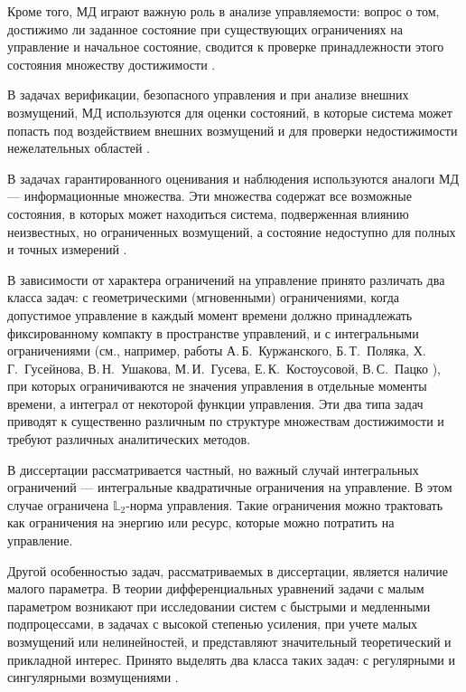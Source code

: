 \documentclass[../main.tex]{subfiles}
\begin{document}
Кроме того, МД играют важную роль в анализе управляемости: вопрос о том, достижимо ли заданное состояние при существующих ограничениях на управление и начальное состояние, сводится к проверке принадлежности этого состояния множеству достижимости \cite{Kur1, Kurzhanski1977}.

В задачах верификации, безопасного управления и при анализе внешних возмущений, МД используются для оценки состояний, в которые система может попасть под воздействием внешних возмущений и для проверки недостижимости нежелательных областей \cite{Mitchell, Filippova2015}. 

В задачах гарантированного оценивания и наблюдения используются аналоги МД --- информационные множества. 
Эти множества содержат все возможные состояния, в которых может находиться система, подверженная влиянию неизвестных, но ограниченных возмущений, а состояние недоступно для полных и точных измерений \cite{Kurzhanski1977, Kur1, Schweppe, bi2000, Patsko2019}.

В зависимости от характера ограничений на управление принято различать два класса задач: с геометрическими (мгновенными) ограничениями, когда допустимое управление в каждый момент времени должно принадлежать фиксированному компакту в пространстве управлений, и с интегральными ограничениями (см., например, работы А.\,Б.~Куржанского, Б.\,Т.~Поляка, Х.\,Г.~Гусейнова, В.\,Н.~Ушакова, М.\,И.~Гусева, Е.\,К.~Костоусовой, В.\,С.~Пацко \cite{Kur1, Polyak2004, Guseinov2007, Guseinov2009, Guseinov2010, Guseinov2024, GusZyk, Kostousova,Patsko2023}), при которых ограничиваются не значения управления в отдельные моменты времени, а интеграл от некоторой функции управления. 
Эти два типа задач приводят к существенно различным по структуре множествам достижимости и требуют различных аналитических методов.

В диссертации рассматривается частный, но важный случай интегральных ограничений --- интегральные квадратичные ограничения на управление. 
В этом случае ограничена $\mathbb{L}_2$-норма управления. 
Такие ограничения можно трактовать как ограничения на энергию или ресурс, которые можно потратить на управление. 

Другой особенностью задач, рассматриваемых в диссертации, является наличие малого параметра. 
В теории дифференциальных уравнений задачи с малым параметром возникают при исследовании систем с быстрыми и медленными подпроцессами, в задачах с высокой степенью усиления, при учете малых возмущений или нелинейностей, и представляют значительный теоретический и прикладной интерес. 
Принято выделять два класса таких задач: с регулярными и сингулярными возмущениями \cite{Tihonov1948,Tihonov1952}.
\end{document}
